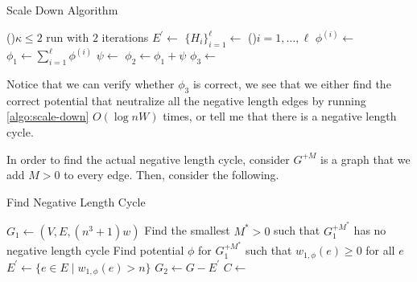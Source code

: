 \begin{algorithm}[H]\label{algo:scale-down}
	\DontPrintSemicolon{}
	\caption{Scale Down Algorithm}

	\BlankLine

	\If(){\(\kappa \leq 2\)}{
		run \BellmanFord{} with \(2\) iterations
	}
	\(E^{\prime} \gets\)\;
	\(\{ H_i \} _{i=1}^{\ell }\gets\)\;
	\For(){\(i = 1, \dots , \ell \)}{
		\(\phi ^{(i)}\gets\)\;
	}
	\(\phi _1 \gets \sum_{i=1}^{\ell } \phi ^{(i)}\)\;
	\(\psi \gets\)\;
	\(\phi _2 \gets \phi _1 + \psi \)\;
	\(\phi _3 \gets\)\;
	\;
\end{algorithm}

Notice that we can verify whether \(\phi _3\) is correct, we see that we either find the correct potential that neutralize all the negative length edges by running \autoref{algo:scale-down} \(O(\log nW)\) times, or tell me that there is a negative length cycle.

\begin{remark}
	In order to find the actual negative length cycle, consider \(G^{+M}\) is a graph that we add \(M > 0\) to every edge. Then, consider the following.

	\begin{algorithm}[H]\label{algo:find-negative-cyele}
		\DontPrintSemicolon{}
		\caption{Find Negative Length Cycle}
		\BlankLine

		\(G_1 \gets (V, E, (n^3 + 1)w)\)\;
		Find the smallest \(M^{\ast} > 0\) such that \(G_1^{+M^{\ast} }\) has no negative length cycle\;
		Find potential \(\phi \) for \(G_1^{+M^{\ast} }\) such that \(w_{1, \phi }(e) \geq 0\) for all \(e\)\;
		\(E^{\prime} \gets \{ e \in E \mid w_{1, \phi }(e) > n \} \)\;
		\(G_2 \gets G - E^{\prime} \)\;
		\(C \gets\)\;
		\;
	\end{algorithm}
\end{remark}
